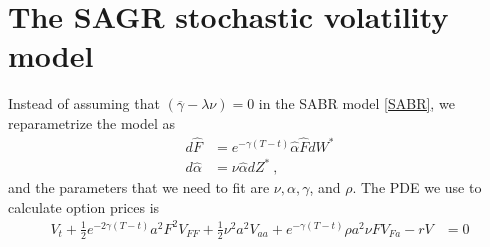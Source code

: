 \documentclass[10pt]{article}
\numberwithin{equation}{section}
\begin{document}
\section{The SAGR stochastic volatility model}
Instead of assuming that $(\overline{\gamma}-\lambda \nu)=0$ in the SABR model \eqref{SABR}, we reparametrize the model as
\begin{equation}\label{SAGR}
	\begin{split}
		d\widehat{F} &= e^{-\gamma(T-t)}\widehat{\alpha} \widehat{F} dW^{*}\\
		d \widehat{\alpha }&= \nu \widehat{\alpha} dZ^{*}\:,
	\end{split}
\end{equation}
and the parameters that we need to fit are $\nu,\alpha, \gamma$, and $\rho$. The PDE we use to calculate option prices is
\begin{equation}\label{SAGR_PDE}
	\begin{split}
	V_t + \frac{1}{2}e^{-2\gamma(T-t)} a^2 F^2 V_{FF}+ \frac{1}{2} \nu^2 a^2 V_{aa}  + e^{-\gamma(T-t)}\rho a^2 \nu F V_{Fa} - r V&=0\\
	\end{split}
\end{equation}


\end{document}
